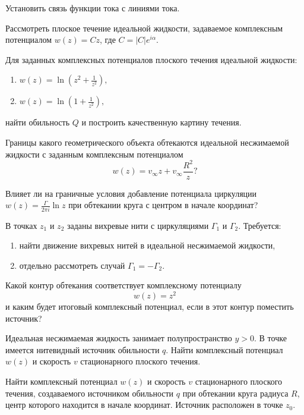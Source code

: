 \documentclass[a4paper, 14pt]{extarticle}
\begin{document}
\begin{problems}

	\item Установить связь функции тока с линиями тока.

	\item Рассмотреть плоское течение идеальной жидкости, задаваемое комплексным потенциалом $w(z) = Cz$, где $C = |C| e^{i \alpha}$.

	\item Для заданных комплексных потенциалов плоского течения идеальной жидкости:
		\begin{enumerate}
			\item 
			$
				w(z) = \ln \left( z^2 + \displaystyle\frac{1}{z^2} \right),
			$
			\item 
			$ 
			w(z) = \ln \left( 1 + \displaystyle\frac{1}{z^2} \right),
			$
		\end{enumerate}
	найти обильность $Q$ и построить качественную картину течения.
	
	\item 
	Границы какого геометрического объекта обтекаются идеальной несжимаемой жидкости с заданным комплексным потенциалом
	\[
		w(z)  = v_\infty z + v_\infty \frac{R^2}{z}?
	\]
	
	Влияет ли на граничные условия добавление потенциала циркуляции  $w(z) = \displaystyle\frac{\Gamma}{2 \pi i} \ln z$ при обтекании круга с центром в начале координат?
	
	
	\item В точках $z_1$ и $z_2$ заданы вихревые нити с циркуляциями $\Gamma_1$ и $\Gamma_2$. Требуется:
	\begin{enumerate}
		\item найти движение вихревых нитей в идеальной несжимаемой жидкости, 
		\item отдельно рассмотреть случай $\Gamma_1 = -\Gamma_2$.
	\end{enumerate}

	\item
	Какой контур обтекания соответствует комплексному потенциалу
	\[
	w(z) = z^2
	\]
	и каким будет итоговый комплексный потенциал, если в этот контур поместить источник?
	
	\item
	Идеальная несжимаемая жидкость занимает полупространство $y>0$. В точке  имеется нитевидный источник обильности $q$. Найти комплексный потенциал $w(z)$ и скорость $v$ стационарного плоского течения.
	
	\item
	Найти комплексный потенциал $w(z)$ и скорость $v$ стационарного плоского течения, создаваемого источником обильности $q$ при обтекании круга радиуса $R$, центр которого находится в начале координат. Источник расположен в точке $z_0$. 
	

\end{problems}
\end{document}
